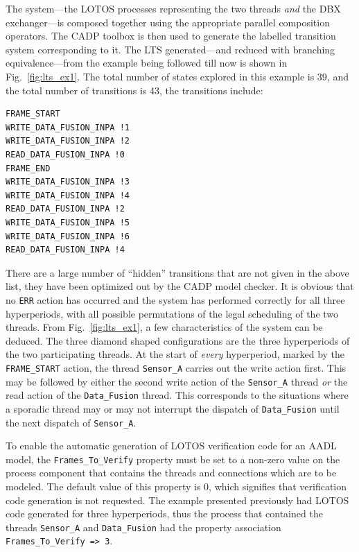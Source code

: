 The system---the LOTOS processes representing the two threads
\emph{and} the DBX exchanger---is composed together using the
appropriate parallel composition operators. The CADP toolbox is then
used to generate the labelled transition system corresponding to
it. The LTS generated---and reduced with branching equivalence---from
the example being followed till now is shown in
Fig.~\ref{fig:lts_ex1}. The total number of states explored in this
example is 39, and the total number of transitions is 43, the
transitions include:

\begin{verbatim}
FRAME_START 
WRITE_DATA_FUSION_INPA !1 
WRITE_DATA_FUSION_INPA !2 
READ_DATA_FUSION_INPA !0 
FRAME_END 
WRITE_DATA_FUSION_INPA !3 
WRITE_DATA_FUSION_INPA !4 
READ_DATA_FUSION_INPA !2 
WRITE_DATA_FUSION_INPA !5 
WRITE_DATA_FUSION_INPA !6 
READ_DATA_FUSION_INPA !4 
\end{verbatim}

There are a large number of ``hidden'' transitions that are not given
in the above list, they have been optimized out by the CADP model
checker. It is obvious that no \texttt{ERR} action has occurred and
the system has performed correctly for all three hyperperiods, with
all possible permutations of the legal scheduling of the two
threads. From Fig.~\ref{fig:lts_ex1}, a few characteristics of the
system can be deduced. The three diamond shaped configurations are the
three hyperperiods of the two participating threads. At the start of
\emph{every} hyperperiod, marked by the \texttt{FRAME\_START} action,
the thread \texttt{Sensor\_A} carries out the write action first. This
may be followed by either the second write action of the
\texttt{Sensor\_A} thread \emph{or} the read action of the
\texttt{Data\_Fusion} thread. This corresponds to the situations where
a sporadic thread may or may not interrupt the dispatch of
\texttt{Data\_Fusion} until the next dispatch of \texttt{Sensor\_A}.

To enable the automatic generation of LOTOS verification code for an
AADL model, the \texttt{Frames\_To\_Verify} property must be set to a
non-zero value on the process component that contains the threads and
connections which are to be modeled. The default value of this
property is 0, which signifies that verification code generation is
not requested. The example presented previously had LOTOS code
generated for three hyperperiods, thus the process that contained the
threads \texttt{Sensor\_A} and \texttt{Data\_Fusion} had the property
association \texttt{Frames\_To\_Verify => 3}.

